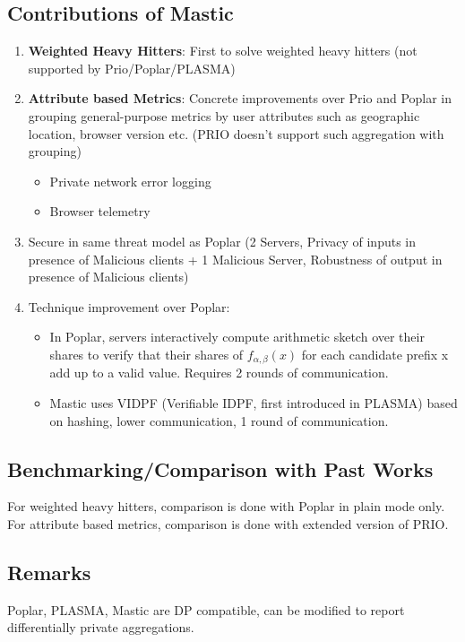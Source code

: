 \subsection{Contributions of Mastic}
\begin{enumerate}
   \item \textbf{Weighted Heavy Hitters}: First to solve weighted heavy hitters (not supported by Prio/Poplar/PLASMA)
   \item \textbf{Attribute based Metrics}: Concrete improvements over Prio and Poplar in grouping general-purpose metrics by user attributes such as geographic location, browser version etc. (PRIO doesn't support such aggregation with grouping)
    \begin{itemize}
        \item Private network error logging
        \item Browser telemetry
    \end{itemize}
    \item Secure in same threat model as Poplar (2 Servers, Privacy of inputs in presence of Malicious clients + 1 Malicious Server, Robustness of output in presence of Malicious clients)
    \item Technique improvement over Poplar:
    \begin{itemize}
        \item In Poplar, servers interactively compute arithmetic sketch over their shares to verify that their shares of $f_{\alpha, \beta}(x)$ for each candidate prefix x add up to a valid value. Requires 2 rounds of communication.
        \item Mastic uses VIDPF (Verifiable IDPF, first introduced in PLASMA) based on hashing, lower communication, 1 round of communication.
    \end{itemize}
\end{enumerate}

\subsection{Benchmarking/Comparison with Past Works}
For weighted heavy hitters, comparison is done with Poplar in plain mode only.\\

For attribute based metrics, comparison is done with extended version of PRIO.

\subsection{Remarks}
Poplar, PLASMA, Mastic are DP compatible, can be modified to report differentially private aggregations.

